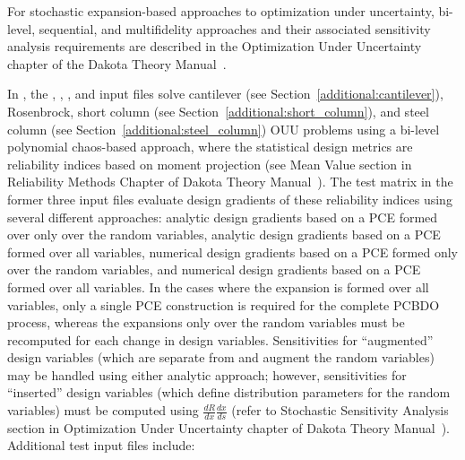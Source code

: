 For stochastic expansion-based approaches to optimization under
uncertainty, bi-level, sequential, and multifidelity approaches and
their associated sensitivity analysis requirements are described in
the Optimization Under Uncertainty chapter of the Dakota Theory
Manual~\cite{TheoMan}.

In , the ,
,
, and
 input files solve cantilever
(see Section~\ref{additional:cantilever}), Rosenbrock, short column
(see Section~\ref{additional:short_column}), and steel column (see
Section~\ref{additional:steel_column}) OUU problems using a bi-level
polynomial chaos-based approach, where the statistical design metrics
are reliability indices based on moment projection (see Mean Value
section in Reliability Methods Chapter of Dakota Theory
Manual~\cite{TheoMan}). The test matrix in the former three input
files evaluate design gradients of these reliability indices using
several different approaches: analytic design gradients based on a PCE
formed over only over the random variables, analytic design gradients
based on a PCE formed over all variables, numerical design gradients
based on a PCE formed only over the random variables, and numerical
design gradients based on a PCE formed over all variables. In the
cases where the expansion is formed over all variables, only a single
PCE construction is required for the complete PCBDO process, whereas
the expansions only over the random variables must be recomputed for
each change in design variables. Sensitivities for ``augmented''
design variables (which are separate from and augment the random
variables) may be handled using either analytic approach; however,
sensitivities for ``inserted'' design variables (which define
distribution parameters for the random variables) must be 
computed using $\frac{dR}{dx} \frac{dx}{ds}$ (refer to Stochastic
Sensitivity Analysis section in Optimization Under Uncertainty chapter
of Dakota Theory Manual~\cite{TheoMan}). Additional test input files
include:
